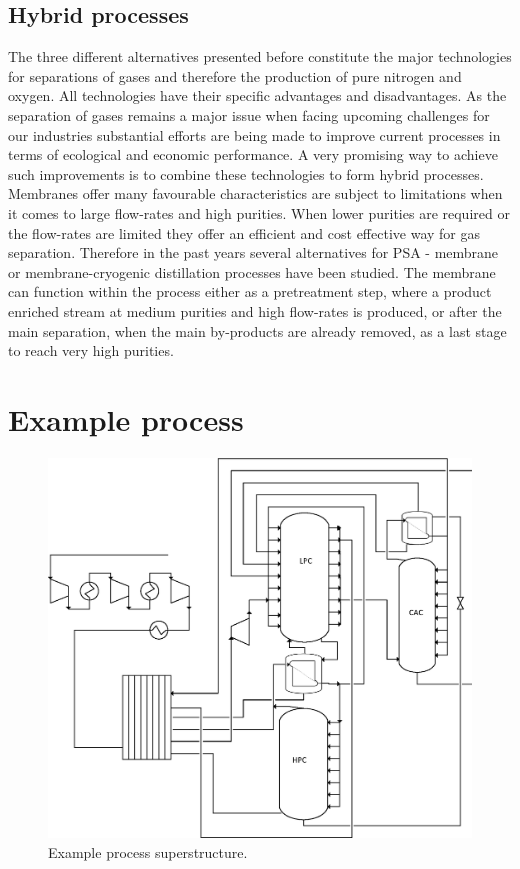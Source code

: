         \subsection{Hybrid processes}
        The three different alternatives presented before constitute the major technologies for separations
        of gases and therefore the production of pure nitrogen and oxygen. All technologies have their specific
        advantages and disadvantages. As the separation of gases remains a major issue when facing upcoming challenges
        for our industries substantial efforts are being made to improve current processes in terms of ecological
        and economic performance. A very promising way to achieve such improvements is to combine these technologies
        to form hybrid processes. Membranes offer many favourable characteristics are subject to limitations when
        it comes to large flow-rates and high purities. When lower purities are required or the flow-rates are limited
        they offer an efficient and cost effective way for gas separation. Therefore in the past years several
        alternatives for PSA - membrane \cite{Akinlabi.2007} or membrane-cryogenic distillation processes \cite{Wankat.2011}
        have been studied. The membrane can function within the process either as a pretreatment step, where a product enriched
        stream at medium purities and high flow-rates is produced, or after the main separation, when the main
        by-products are already removed, as a last stage to reach very high purities.
    
    \section{Example process}
    \begin{figure}
        \footnotesize
        \center
        \includegraphics[width=\linewidth]{Pictures/ASU_superstructure}
        \caption{Example process superstructure.}
        \label{fig:opt:exppro}
    \end{figure}

